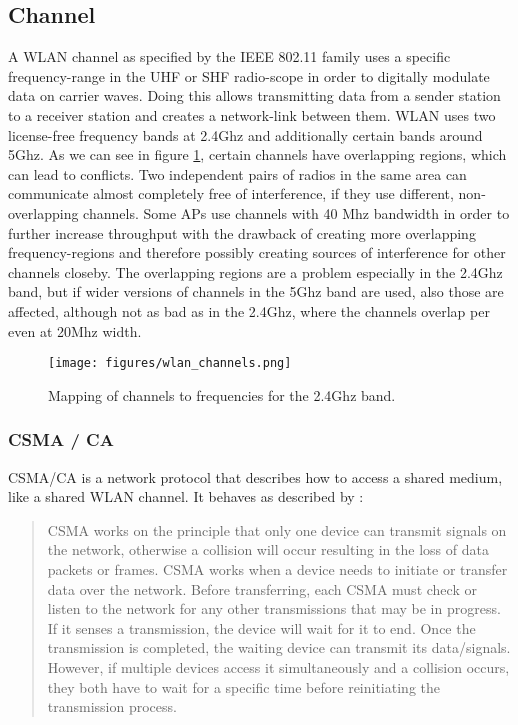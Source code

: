   \subsection{Channel}
    A \ac{WLAN} channel as specified by the IEEE 802.11 family uses a specific frequency-range in the \ac{UHF} or \ac{SHF} radio-scope in order 
    to digitally modulate data on carrier waves.
    Doing this allows transmitting data from a sender station to a receiver station and creates a network-link between them.
    \ac{WLAN} uses two license-free frequency bands at 2.4Ghz and additionally certain bands around 5Ghz.
    As we can see in figure \ref{fig:wlan_channels}, certain channels have overlapping regions, which can lead to conflicts.
    Two independent pairs of radios in the same area can communicate almost completely free of interference, if they use different, non-overlapping channels.
    Some APs use channels with 40 Mhz bandwidth in order to further increase throughput with the drawback of creating more overlapping frequency-regions
    and therefore possibly creating sources of interference for other channels closeby.
    The overlapping regions are a problem especially in the 2.4Ghz band, but if wider versions of channels in the 5Ghz band are used, also those are affected,
    although not as bad as in the 2.4Ghz, where the channels overlap per even at 20Mhz width.
    
    \begin{figure}[h!]
      \centering
      \texttt{[image: figures/wlan\_channels.png]}
      \caption{Mapping of channels to frequencies for the 2.4Ghz band. \cite{wlan_channels}}
      \label{fig:wlan_channels}
    \end{figure}
    
      \subsubsection{CSMA / CA}
	\ac{CSMA/CA} is a network protocol that describes how to access a shared medium, like a shared WLAN channel.
	It behaves as described by \cite{csma_techo}:
	
	\begin{quotation}
	  CSMA works on the principle that only one device can transmit signals on the network, 
	  otherwise a collision will occur resulting in the loss of data packets or frames. 
	  CSMA works when a device needs to initiate or transfer data over the network. 
	  Before transferring, each CSMA must check or listen to the network for any other transmissions that may be in progress. 
	  If it senses a transmission, the device will wait for it to end. Once the transmission is completed, 
	  the waiting device can transmit its data/signals. However, if multiple devices access it simultaneously and a collision occurs, 
	  they both have to wait for a specific time before reinitiating the transmission process. 
	\end{quotation}
	
